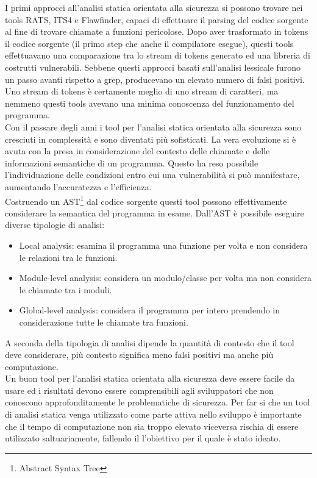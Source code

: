 I primi approcci all'analisi statica orientata alla sicurezza si possono trovare nei tools RATS\cite{rats}, ITS4\cite{its4} e Flawfinder\cite{flawfinder}, capaci di effettuare il parsing del codice sorgente al fine di trovare chiamate a funzioni pericolose. Dopo aver trasformato in tokens il codice sorgente (il primo step che anche il compilatore esegue), questi tools effettuavano una comparazione tra lo stream di tokens generato ed una libreria di costrutti vulnerabili. Sebbene questi approcci basati sull'analisi lessicale furono un passo avanti rispetto a grep, producevano un elevato numero di falsi positivi. Uno stream di tokens è certamente meglio di uno stream di caratteri, ma nemmeno questi tools avevano una minima conoscenza del funzionamento del programma. \\
Con il passare degli anni i tool per l'analisi statica orientata alla sicurezza sono cresciuti in complessità e sono diventati più sofisticati. La vera evoluzione si è avuta con la presa in considerazione del contesto delle chiamate e delle informazioni semantiche di un programma. Questo ha reso possibile l'individuazione delle condizioni entro cui una vulnerabilità si può manifestare, aumentando l'accuratezza e l'efficienza.\\
Costruendo un AST\footnote{Abstract Syntax Tree} dal codice sorgente questi tool possono effettivamente considerare la semantica del programma in esame. Dall'AST è possibile eseguire diverse tipologie di analisi:
\begin{itemize}
\item Local analysis: esamina il programma una funzione per volta e non considera le relazioni tra le funzioni.
\item Module-level analysis: considera un modulo/classe per volta ma non considera le chiamate tra i moduli.
\item Global-level analysis: considera il programma per intero prendendo in considerazione tutte le chiamate tra funzioni.
\end{itemize}
A seconda della tipologia di analisi dipende la quantità di contesto che il tool deve considerare, più contesto significa meno falsi positivi ma anche più computazione.\\
Un buon tool per l'analisi statica orientata alla sicurezza deve essere facile da usare ed i risultati devono essere comprensibili agli sviluppatori che non conoscono approfonditamente le problematiche di sicurezza. Per far si che un tool di analisi statica venga utilizzato come parte attiva nello sviluppo è importante che il tempo di computazione non sia troppo elevato viceversa rischia di essere utilizzato saltuariamente, fallendo il l'obiettivo per il quale è stato ideato.

